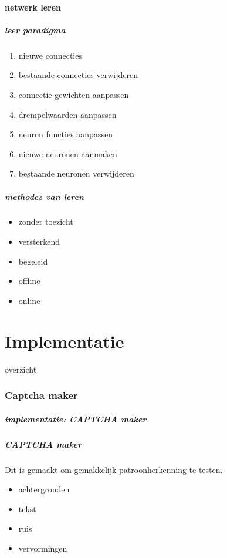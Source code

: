 \documentclass{beamer}
\newcommand{\partTOC}{%
  \begin{frame}{overzicht}%
  \transfade
  \transduration{1}
  \tableofcontents[currentpart]%
  \end{frame}%
}
\begin{document}
\subsection{netwerk leren}
\begin{frame}
  \frametitle{leer paradigma}
  \transfade
  \begin{enumerate}
    \item nieuwe connecties
    \item bestaande connecties verwijderen
    \item connectie gewichten aanpassen
    \item drempelwaarden aanpassen
    \item neuron functies aanpassen
    \item nieuwe neuronen aanmaken
    \item bestaande neuronen verwijderen
  \end{enumerate}
\end{frame}
\begin{frame}
  \frametitle{methodes van leren}
  \transfade
  \begin{itemize}
    \item zonder toezicht
    \item versterkend
    \item begeleid
  \end{itemize}
  \vfill
  \begin{itemize}
    \item offline
    \item online
  \end{itemize}
\end{frame}
\part{Implementatie}
\partTOC
\section{Captcha maker}
\begin{frame}
  \frametitle{implementatie: CAPTCHA maker}
  \transfade
\end{frame}
\begin{frame}
  \frametitle{CAPTCHA maker}
  \transfade
  Dit is gemaakt om gemakkelijk patroonherkenning te testen.
  \begin{itemize}
    \item achtergronden
    \item tekst
    \item ruis
    \item vervormingen
  \end{itemize}
\end{frame}
\end{document}
